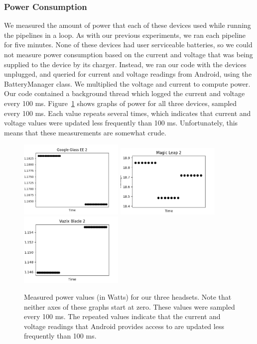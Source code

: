 \subsubsection{Power Consumption}\label{sec:mobile_power_consumption}

We measured the amount of power that each of these devices used while running
the pipelines in a loop.
As with our previous experiments, we ran each pipeline for five minutes.
None of these devices had user serviceable batteries, so we could not measure
power consumption based on the current and voltage that was being
supplied to the device by its charger.
Instead, we ran our code with the devices unplugged, and queried for current and
voltage readings from Android, using the BatteryManager class.
We multiplied the voltage and current to compute power.
Our code contained a background thread which logged the current and voltage
every 100 ms.
Figure~\ref{fig:power_graphs} shows graphs of power for all three devices,
sampled every 100 ms.
Each value repeats several times, which indicates that current and voltage
values were updated less frequently than 100 ms.
Unfortunately, this means that these measurements are somewhat crude.

\begin{figure}
  \includegraphics[width=5cm]{figures/power/glass_wattage.png}
  \includegraphics[width=5cm]{figures/power/magicleap_wattage.png}
  \includegraphics[width=5cm]{figures/power/vuzix_wattage.png}
  \caption{Measured power values (in Watts) for our three headsets.
    Note that neither axes of these graphs start at zero.
    These values were sampled every 100 ms.
    The repeated values indicate that the current and voltage readings that
    Android provides access to are updated less frequently than 100 ms.
  }\label{fig:power_graphs}
\end{figure}

